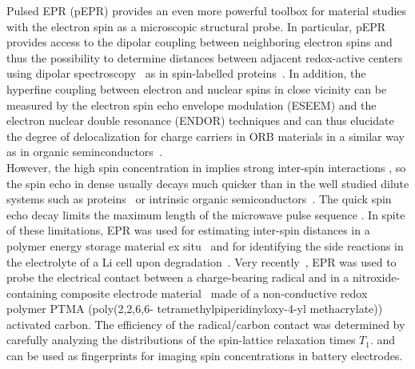 Pulsed EPR (pEPR) provides an even more powerful toolbox for material studies with the electron spin as a microscopic structural probe. In particular, pEPR provides access to the dipolar coupling between neighboring electron spins and thus the possibility to determine distances between adjacent redox-active centers using dipolar spectroscopy~\cite{Salikhov1981} as in spin-labelled proteins~\cite{jeschke2012_annrevphyschem,Toropov1998}. In addition, the hyperfine coupling between electron and nuclear spins in close vicinity can be measured by the electron spin echo envelope modulation (ESEEM) and the electron nuclear double resonance (ENDOR) techniques and can thus elucidate the degree of delocalization for charge carriers in ORB materials in a similar way as in organic seminconductors~\cite{Behrends2011}.\\

However, the high spin concentration in  implies strong inter-spin interactions , so the spin echo in  dense usually decays much quicker than in the well studied dilute systems such as proteins~\cite{jeschke2012_annrevphyschem} or intrinsic organic semiconductors~\cite{Tait2021}. The quick spin echo decay limits the maximum length of the microwave pulse sequence . In spite of these limitations, EPR was used for estimating inter-spin distances in a polymer energy storage material ex situ~\cite{Assumma2020} and for identifying the side reactions in the electrolyte of a Li cell upon degradation~\cite{Szczuka2021}. Very recently~\cite{Daniel2023}, EPR was used to probe the electrical contact between a charge-bearing radical and   in a nitroxide-containing composite electrode material~\cite{IWASA2007} made of a non-conductive redox polymer PTMA (poly(2,2,6,6- tetramethylpiperidinyloxy-4-yl methacrylate))  activated carbon. The efficiency of the radical/carbon contact was determined by carefully analyzing the distributions of the spin-lattice relaxation times $T_1$.  and can be used as fingerprints for imaging spin concentrations in battery electrodes.\\






